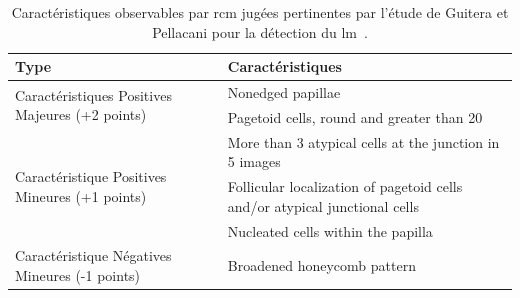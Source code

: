 \begin{table}[H]
\begin{tabular}{ll}
Type                                                                & Caractéristiques                              \\\hline
\multirow{2}{*}{Caractéristiques Positives Majeures (+2 points)}    & Nonedged papillae                             \\\cline{2-2}
                                                                    & Pagetoid cells, round and greater than 20     \\\hline%
\multirow{3}{*}{Caractéristique Positives Mineures (+1 points)}     & More than 3 atypical cells at the junction in 5 images                    \\\cline{2-2}
                                                                    & Follicular localization of pagetoid cells and/or atypical junctional cells\\\cline{2-2}
                                                                    & Nucleated cells within the papilla                                        \\\hline
Caractéristique Négatives Mineures (-1 points)                      & Broadened honeycomb pattern         \\\hline
\end{tabular}
\caption{Caractéristiques observables par \gls{rcm} jugées pertinentes par l'étude de Guitera et Pellacani pour la détection du \gls{lm}~\cite{Guitera2010}.}
\label{tab:light_absorption}
\end{table}\par
 
